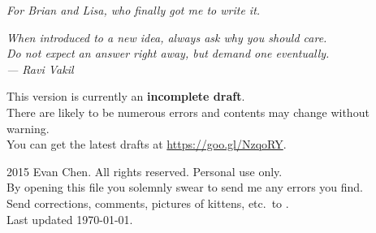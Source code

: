 \begin{titlepage}
	\vspace*{8cm}
	\begin{center}
		\itshape
		\noindent
		For Brian and Lisa, who finally got me to write it.
	\end{center}
\end{titlepage}

\begin{titlepage}
	\vspace*{8cm}
	\begin{flushright}
		\itshape\large
		When introduced to a new idea, always ask why you should care. \\[0.2cm]
		Do not expect an answer right away, but demand one eventually. \\[0.8cm]
		--- Ravi Vakil \cite{ref:vakil}
	\end{flushright}

	
	\vfill

	{
	\footnotesize
	\noindent This version is currently an \textbf{incomplete draft}. \\
	There are likely to be numerous errors and contents may change without warning. \\
	You can get the latest drafts at \url{https://goo.gl/NzqoRY}.
	}
	
	\vspace*{1cm}

	{
	\large
	\noindent {\copyright} 2015 Evan Chen.  All rights reserved. Personal use only. \\[0.8cm]
	By opening this file you solemnly swear to send me any errors you find. \\ [0.4cm]
	Send corrections, comments, pictures of kittens,
	etc.\ to . \\[0.8cm]
	Last updated \today.
	\vspace*{1cm}
	}

\end{titlepage}
